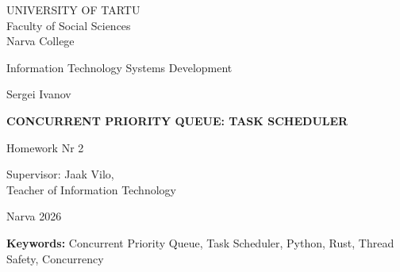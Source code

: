 \begin{titlepage}
    \centering

    {\fontsize{12pt}{14pt}\selectfont 
    UNIVERSITY OF TARTU \\
    Faculty of Social Sciences \\
    Narva College \par}

    \vspace{2cm}

    {\fontsize{12pt}{14pt}\selectfont 
    Information Technology Systems Development \par}

    \vspace{2.5cm}

    {\fontsize{12pt}{14pt}\selectfont Sergei Ivanov \par}

    \vspace{1cm}

    {\fontsize{16pt}{20pt}\selectfont \textbf{CONCURRENT PRIORITY QUEUE: TASK SCHEDULER} \par}

    \vspace{1cm}

    {\fontsize{12pt}{14pt}\selectfont Homework Nr 2 \par}

    \vspace{3cm}

    \begin{flushright}
    {\fontsize{12pt}{14pt}\selectfont 
    Supervisor: Jaak Vilo, \\
    Teacher of Information Technology \par}
    \end{flushright}

    \vfill

    {\fontsize{12pt}{14pt}\selectfont Narva 2026 \par}

\end{titlepage}


\begin{abstract}
This homework focuses on the implementation of a concurrent priority queue 
to serve as a task scheduler. The main objective is to design and implement 
a system that can manage and execute tasks based on their priority levels 
while ensuring thread safety and efficient concurrency. The implementation 
will be done in both Python and Rust, allowing for a comparison of performance 
and ease of use between the two languages. The task scheduler will be tested 
with various workloads to evaluate its effectiveness in handling concurrent 
tasks with different priorities.
\end{abstract}

\vspace{0.5cm}

\noindent\textbf{Keywords:} Concurrent Priority Queue, Task Scheduler, Python, Rust, Thread Safety, Concurrency
\tableofcontents
\clearpage


